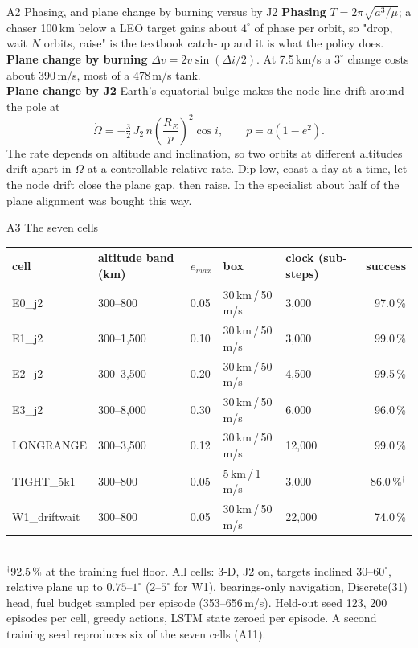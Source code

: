 \documentclass[aspectratio=169,11pt]{beamer}
\newcommand{\dv}{\ensuremath{\Delta v}}
\newcommand{\boxR}{30\,km}
\newcommand{\boxV}{50\,m/s}
\begin{document}
\begin{frame}{A2 \; Phasing, and plane change by burning versus by J2}
\small
\textbf{Phasing} \; $T = 2\pi\sqrt{a^3/\mu}$; a chaser 100\,km below a LEO target gains about $4^\circ$ of phase per orbit, so "drop, wait $N$ orbits, raise" is the textbook catch-up and it is what the policy does.\\[2mm]
\textbf{Plane change by burning} \; $\dv = 2v\sin(\Delta i/2)$. At 7.5\,km/s a $3^\circ$ change costs about 390\,m/s, most of a 478\,m/s tank.\\[2mm]
\textbf{Plane change by J2} \; Earth's equatorial bulge makes the node line drift around the pole at
\[ \dot\Omega = -\tfrac32\, J_2\, n \left(\frac{R_E}{p}\right)^{2} \cos i, \qquad p = a(1-e^2). \]
The rate depends on altitude and inclination, so two orbits at different altitudes drift apart in $\Omega$ at a controllable relative rate. Dip low, coast a day at a time, let the node drift close the plane gap, then raise. In the specialist about half of the plane alignment was bought this way.
\end{frame}

\begin{frame}{A3 \; The seven cells}
\scriptsize
\begin{tabular}{@{}lllllr@{}}
\toprule
cell & altitude band (km) & $e_{max}$ & box & clock (sub-steps) & success\\
\midrule
E0\_j2 & 300--800 & 0.05 & \boxR\,/\,\boxV & 3,000 & 97.0\,\%\\
E1\_j2 & 300--1,500 & 0.10 & \boxR\,/\,\boxV & 3,000 & 99.0\,\%\\
E2\_j2 & 300--3,500 & 0.20 & \boxR\,/\,\boxV & 4,500 & 99.5\,\%\\
E3\_j2 & 300--8,000 & 0.30 & \boxR\,/\,\boxV & 6,000 & 96.0\,\%\\
LONGRANGE & 300--3,500 & 0.12 & \boxR\,/\,\boxV & 12,000 & 99.0\,\%\\
TIGHT\_5k1 & 300--800 & 0.05 & 5\,km\,/\,1\,m/s & 3,000 & 86.0\,\%$^\dagger$\\
W1\_driftwait & 300--800 & 0.05 & \boxR\,/\,\boxV & 22,000 & 74.0\,\%\\
\bottomrule
\end{tabular}
\\[2mm]
$^\dagger$92.5\,\% at the training fuel floor. All cells: 3-D, J2 on, targets inclined $30$--$60^\circ$, relative plane up to $0.75$--$1^\circ$ ($2$--$5^\circ$ for W1), bearings-only navigation, Discrete(31) head, fuel budget sampled per episode (353--656\,m/s). Held-out seed 123, 200 episodes per cell, greedy actions, LSTM state zeroed per episode. A second training seed reproduces six of the seven cells (A11).
\end{frame}
\end{document}
